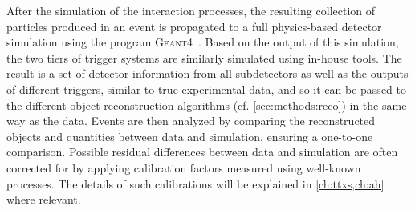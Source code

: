 After the simulation of the interaction processes, the resulting collection of particles produced in an event is propagated to a full physics-based detector simulation using the program \textsc{Geant4}~\cite{GEANT4:2002}. Based on the output of this simulation, the two tiers of trigger systems are similarly simulated using in-house tools. The result is a set of detector information from all subdetectors as well as the outputs of different triggers, similar to true experimental data, and so it can be passed to the different object reconstruction algorithms (cf. \cref{sec:methods:reco}) in the same way as the data. Events are then analyzed by comparing the reconstructed objects and quantities between data and simulation, ensuring a one-to-one comparison. Possible residual differences between data and simulation are often corrected for by applying calibration factors measured using well-known processes. The details of such calibrations will be explained in \cref{ch:ttxs,ch:ah} where relevant.
